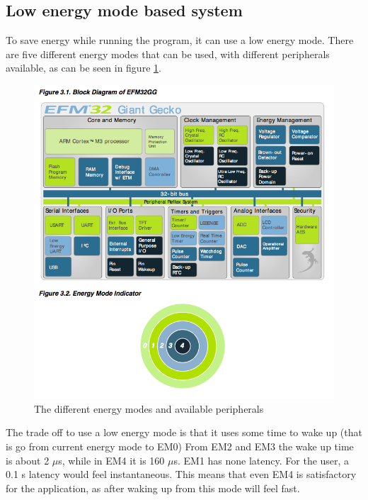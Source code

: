 

\subsection{Low energy mode based system}
\label{subsection:low-energy}

To save energy while running the program, it can use a low energy mode.
There are five different energy modes that can be used, with different peripherals available, as can be seen in figure \ref{fig:energy_modes}.\cite{referencemanual}

\begin{figure}[H]
\centering
\includegraphics[scale=0.5]{figures/energymodes.png}
\caption{The different energy modes and available peripherals}
\label{fig:energy_modes}
\end{figure}

The trade off to use a low energy mode is that it uses some time to wake up (that is go from current energy mode to EM0)
From EM2 and EM3  the wake up time is about 2 $\mu$s, while in EM4 it is 160 $\mu$s.
EM1 has none latency.
For the user, a 0.1 s latency would feel instantaneous.\cite{response}
This means that even EM4 is satisfactory for the application, as after waking up from this mode will feel fast.

